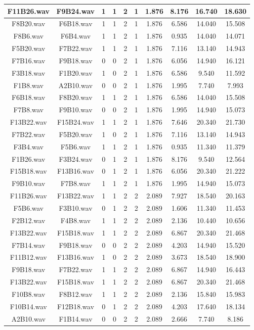 \documentclass[11pt,a4paper]{book}
\begin{document}
\begin{longtable}[c]{|c|c|c|c|c|c|c|c|c|c|}
F11B26.wav&F9B24.wav&1&1&2&1&1.876&8.176&16.740&18.630\\ \hline
F8B20.wav&F6B18.wav&1&1&2&1&1.876&6.586&14.040&15.508\\ \hline
F8B6.wav&F6B4.wav&1&1&2&1&1.876&0.935&14.040&14.071\\ \hline
F5B20.wav&F7B22.wav&1&1&2&1&1.876&7.116&13.140&14.943\\ \hline
F7B16.wav&F9B18.wav&0&0&2&1&1.876&6.056&14.940&16.121\\ \hline
F3B18.wav&F1B20.wav&1&0&2&1&1.876&6.586&9.540&11.592\\ \hline
F1B8.wav&A2B10.wav&0&0&2&1&1.876&1.995&7.740&7.993\\ \hline
F6B18.wav&F8B20.wav&1&1&2&1&1.876&6.586&14.040&15.508\\ \hline
F7B8.wav&F9B10.wav&0&0&2&1&1.876&1.995&14.940&15.073\\ \hline
F13B22.wav&F15B24.wav&1&1&2&1&1.876&7.646&20.340&21.730\\ \hline
F7B22.wav&F5B20.wav&1&0&2&1&1.876&7.116&13.140&14.943\\ \hline
F3B4.wav&F5B6.wav&1&1&2&1&1.876&0.935&11.340&11.379\\ \hline
F1B26.wav&F3B24.wav&0&1&2&1&1.876&8.176&9.540&12.564\\ \hline
F15B18.wav&F13B16.wav&0&1&2&1&1.876&6.056&20.340&21.222\\ \hline
F9B10.wav&F7B8.wav&1&1&2&1&1.876&1.995&14.940&15.073\\ \hline
F11B26.wav&F13B22.wav&1&1&2&2&2.089&7.927&18.540&20.163\\ \hline
F5B6.wav&F3B10.wav&0&1&2&2&2.089&1.606&11.340&11.453\\ \hline
F2B12.wav&F4B8.wav&1&1&2&2&2.089&2.136&10.440&10.656\\ \hline
F13B22.wav&F15B18.wav&1&1&2&2&2.089&6.867&20.340&21.468\\ \hline
F7B14.wav&F9B18.wav&0&0&2&2&2.089&4.203&14.940&15.520\\ \hline
F11B12.wav&F13B16.wav&1&0&2&2&2.089&3.673&18.540&18.900\\ \hline
F9B18.wav&F7B22.wav&1&1&2&2&2.089&6.867&14.940&16.443\\ \hline
F13B22.wav&F15B18.wav&1&1&2&2&2.089&6.867&20.340&21.468\\ \hline
F10B8.wav&F8B12.wav&1&1&2&2&2.089&2.136&15.840&15.983\\ \hline
F10B14.wav&F12B18.wav&0&1&2&2&2.089&4.203&17.640&18.134\\ \hline
A2B10.wav&F1B14.wav&0&0&2&2&2.089&2.666&7.740&8.186\\ \hline

\end{longtable}
\end{document}
